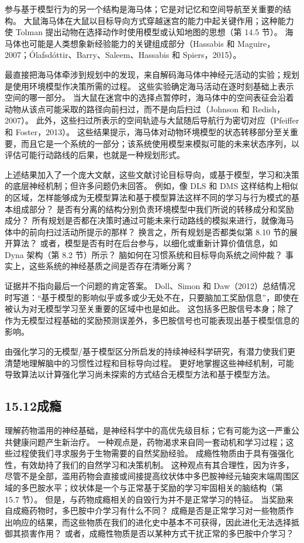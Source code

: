 \documentclass[UTF8,12pt,a4paper,fontset=fandol]{ctexart}
\begin{document}
参与基于模型行为的另一个结构是海马体；它是对记忆和空间导航至关重要的结构。
大鼠海马体在大鼠以目标导向方式穿越迷宫的能力中起关键作用；这种能力使 Tolman 提出动物在选择动作时使用模型或认知地图的思想（第 14.5 节）。
海马体也可能是人类想象新经验能力的关键组成部分（Hassabis 和 Maguire，2007；Ólafsdóttir、Barry、Saleem、Hassabis 和 Spiers，2015）。

最直接把海马体牵涉到规划中的发现，来自解码海马体中神经元活动的实验；规划是使用环境模型作决策所需的过程。
这些实验确定海马活动在逐时刻基础上表示空间的哪一部分。
当大鼠在迷宫中的选择点暂停时，海马体中的空间表征会沿着动物从该点可能采取的路径向前扫过，而不是向后扫过（Johnson 和 Redish，2007）。
此外，这些扫过所表示的空间轨迹与大鼠随后导航行为密切对应（Pfeiffer 和 Foster，2013）。
这些结果提示，海马体对动物环境模型的状态转移部分至关重要，而且它是一个系统的一部分；该系统使用模型来模拟可能的未来状态序列，以评估可能行动路线的后果，也就是一种规划形式。

上述结果加入了一个庞大文献，这些文献讨论目标导向，或基于模型，学习和决策的底层神经机制；但许多问题仍未回答。
例如，像 DLS 和 DMS 这样结构上相似的区域，怎样能够成为无模型算法和基于模型算法这样不同的学习与行为模式的基本组成部分？
是否有分离的结构分别负责环境模型中我们所说的转移成分和奖励成分？
所有规划是否都在决策时通过可能未来行动路线的模拟来进行，就像海马体中的前向扫过活动所提示的那样？
换言之，所有规划是否都类似第 8.10 节的展开算法？
或者，模型是否有时在后台参与，以细化或重新计算价值信息，如 Dyna 架构（第 8.2 节）所示？
脑如何在习惯系统和目标导向系统之间仲裁？
事实上，这些系统的神经基质之间是否存在清晰分离？

证据并不指向最后一个问题的肯定答案。
Doll、Simon 和 Daw（2012）总结情况时写道：“基于模型的影响似乎或多或少无处不在，只要脑加工奖励信息”，即使在被认为对无模型学习至关重要的区域中也是如此。
这包括多巴胺信号本身；除了作为无模型过程基础的奖励预测误差外，多巴胺信号也可能表现出基于模型信息的影响。

由强化学习的无模型/基于模型区分所启发的持续神经科学研究，有潜力使我们更清楚地理解脑中的习惯性过程和目标导向过程。
更好地掌握这些神经机制，可能导致算法以计算强化学习尚未探索的方式结合无模型方法和基于模型方法。

\subsection*{15.12\quad 成瘾}

理解药物滥用的神经基础，是神经科学中的高优先级目标；它有可能为这一严重公共健康问题产生新治疗。
一种观点是，药物渴求来自同一套动机和学习过程；这些过程使我们寻求服务于生物需要的自然奖励经验。
成瘾性物质由于具有强强化性，有效劫持了我们的自然学习和决策机制。
这种观点有其合理性，因为许多，尽管不是全部，滥用药物会直接或间接提高纹状体中多巴胺神经元轴突末端周围区域的多巴胺水平；纹状体是一个与正常基于奖励的学习牢固相关的脑结构（第 15.7 节）。
但是，与药物成瘾相关的自毁行为并不是正常学习的特征。
当奖励来自成瘾药物时，多巴胺中介学习有什么不同？
成瘾是否是正常学习对一些物质作出响应的结果，而这些物质在我们的进化史中基本不可获得，因此进化无法选择抵御其损害作用？
或者，成瘾性物质是否以某种方式干扰正常的多巴胺中介学习？
\end{document}
